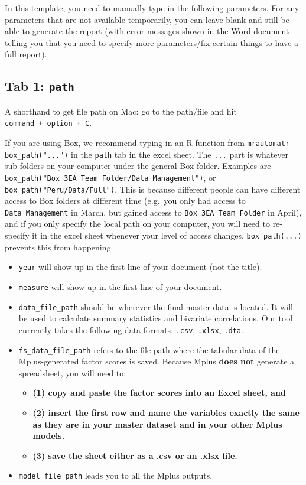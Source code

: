 \documentclass[
]{book}
\begin{document}
In this template, you need to manually type in the following parameters. For any parameters that are not available temporarily, you can leave blank and still be able to generate the report (with error messages shown in the Word document telling you that you need to specify more parameters/fix certain things to have a full report).

\hypertarget{tab-1-path}{%
\subsection{\texorpdfstring{Tab 1: \texttt{path}}{Tab 1: path}}\label{tab-1-path}}

A shorthand to get file path on Mac: go to the path/file and hit \texttt{command\ +\ option\ +\ C}.

If you are using Box, we recommend typing in an R function from \texttt{mrautomatr} -- \texttt{box\_path("...")} in the \texttt{path} tab in the excel sheet. The \texttt{...} part is whatever sub-folders on your computer under the general Box folder. Examples are \texttt{box\_path("Box\ 3EA\ Team\ Folder/Data\ Management")}, or \texttt{box\_path("Peru/Data/Full")}. This is because different people can have different access to Box folders at different time (e.g.~you only had access to \texttt{Data\ Management} in March, but gained access to \texttt{Box\ 3EA\ Team\ Folder} in April), and if you only specify the local path on your computer, you will need to re-specify it in the excel sheet whenever your level of access changes. \texttt{box\_path(...)} prevents this from happening.

\begin{itemize}
\item
  \texttt{year} will show up in the first line of your document (not the title).
\item
  \texttt{measure} will show up in the first line of your document.
\item
  \texttt{data\_file\_path} should be wherever the final master data is located. It will be used to calculate summary statistics and bivariate correlations. Our tool currently takes the following data formats: \texttt{.csv}, \texttt{.xlsx}, \texttt{.dta}.
\item
  \texttt{fs\_data\_file\_path} refers to the file path where the tabular data of the Mplus-generated factor scores is saved. Because Mplus \textbf{does not} generate a spreadsheet, you will need to:

  \begin{itemize}
  \item
    \textbf{(1) copy and paste the factor scores into an Excel sheet, and}
  \item
    \textbf{(2) insert the first row and name the variables exactly the same as they are in your master dataset and in your other Mplus models.}
  \item
    \textbf{(3) save the sheet either as a .csv or an .xlsx file.}
  \end{itemize}
\item
  \texttt{model\_file\_path} leads you to all the Mplus outputs.
\end{itemize}
\end{document}
